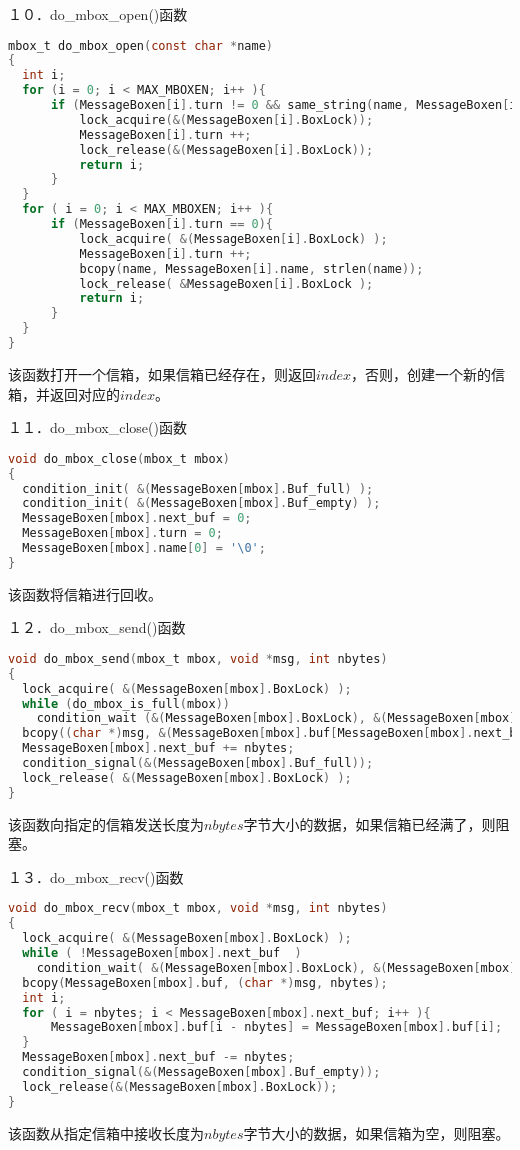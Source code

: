 \documentclass[UTF8,noindent]{ctexart}
\begin{document}
１０．do\_mbox\_open()函数
\begin{lstlisting}[language=c]
mbox_t do_mbox_open(const char *name)
{
  int i;
  for (i = 0; i < MAX_MBOXEN; i++ ){
	  if (MessageBoxen[i].turn != 0 && same_string(name, MessageBoxen[i].name) ){
		  lock_acquire(&(MessageBoxen[i].BoxLock));
		  MessageBoxen[i].turn ++;
		  lock_release(&(MessageBoxen[i].BoxLock));
		  return i;
	  }
  }
  for ( i = 0; i < MAX_MBOXEN; i++ ){
	  if (MessageBoxen[i].turn == 0){
		  lock_acquire( &(MessageBoxen[i].BoxLock) );
		  MessageBoxen[i].turn ++;
		  bcopy(name, MessageBoxen[i].name, strlen(name));
		  lock_release( &MessageBoxen[i].BoxLock );
		  return i;
	  }
  }
}
\end{lstlisting}
该函数打开一个信箱，如果信箱已经存在，则返回$index$，否则，创建一个新的信箱，并返回对应的$index$。

１１．do\_mbox\_close()函数
\begin{lstlisting}[language=c]
void do_mbox_close(mbox_t mbox)
{
  condition_init( &(MessageBoxen[mbox].Buf_full) );
  condition_init( &(MessageBoxen[mbox].Buf_empty) );
  MessageBoxen[mbox].next_buf = 0;
  MessageBoxen[mbox].turn = 0;
  MessageBoxen[mbox].name[0] = '\0';
}
\end{lstlisting}
该函数将信箱进行回收。

１２．do\_mbox\_send()函数
\begin{lstlisting}[language=c]
void do_mbox_send(mbox_t mbox, void *msg, int nbytes)
{
  lock_acquire( &(MessageBoxen[mbox].BoxLock) );
  while (do_mbox_is_full(mbox))
	condition_wait (&(MessageBoxen[mbox].BoxLock), &(MessageBoxen[mbox].Buf_empty));
  bcopy((char *)msg, &(MessageBoxen[mbox].buf[MessageBoxen[mbox].next_buf]), nbytes);
  MessageBoxen[mbox].next_buf += nbytes;
  condition_signal(&(MessageBoxen[mbox].Buf_full));
  lock_release( &(MessageBoxen[mbox].BoxLock) );
}
\end{lstlisting}
该函数向指定的信箱发送长度为$nbytes$字节大小的数据，如果信箱已经满了，则阻塞。

１３．do\_mbox\_recv()函数
\begin{lstlisting}[language=c]
void do_mbox_recv(mbox_t mbox, void *msg, int nbytes)
{
  lock_acquire( &(MessageBoxen[mbox].BoxLock) );
  while ( !MessageBoxen[mbox].next_buf  )
	condition_wait( &(MessageBoxen[mbox].BoxLock), &(MessageBoxen[mbox].Buf_full) );
  bcopy(MessageBoxen[mbox].buf, (char *)msg, nbytes);
  int i;
  for ( i = nbytes; i < MessageBoxen[mbox].next_buf; i++ ){
	  MessageBoxen[mbox].buf[i - nbytes] = MessageBoxen[mbox].buf[i];
  }
  MessageBoxen[mbox].next_buf -= nbytes;
  condition_signal(&(MessageBoxen[mbox].Buf_empty));
  lock_release(&(MessageBoxen[mbox].BoxLock));
}
\end{lstlisting}
该函数从指定信箱中接收长度为$nbytes$字节大小的数据，如果信箱为空，则阻塞。
\end{document}
